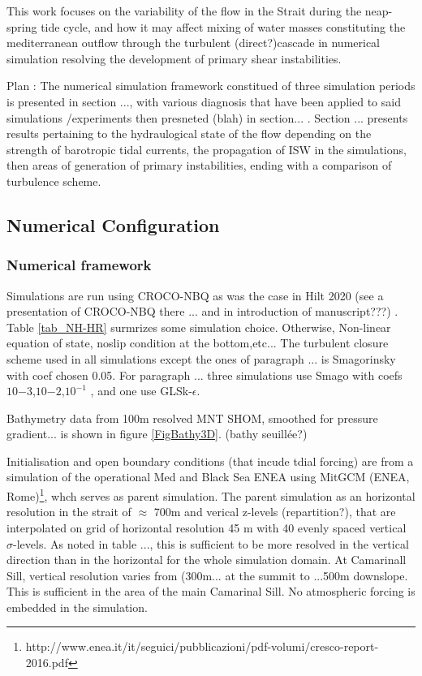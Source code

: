 This work focuses on the variability of the flow in the Strait during the neap-spring tide cycle, and how it may affect mixing of water masses constituting the mediterranean outflow through the turbulent (direct?)cascade in numerical simulation resolving the development of primary shear instabilities.

Plan :
The numerical simulation framework constitued of three simulation periods is presented in section ..., with various diagnosis that have been applied to said simulations /experiments then presneted (blah) in section... . Section ... presents results pertaining to the hydraulogical state of the flow depending on the strength of barotropic tidal currents, the propagation of ISW in the simulations, then areas of generation of primary instabilities, ending with a comparison of turbulence scheme.






\subsection{Numerical Configuration}
\subsubsection{Numerical framework}

Simulations are run using CROCO-NBQ as was the case in Hilt 2020 (see a presentation of CROCO-NBQ there ... and in introduction of manuscript???) . Table \ref{tab_NH-HR} surmrizes some simulation choice. Otherwise, Non-linear equation of state, noslip condition at the bottom,etc...  The turbulent closure scheme used in all simulations except the ones of paragraph ... is Smagorinsky with coef chosen 0.05. For paragraph ... three simulations use Smago with coefs $10{-3}$,$10{-2}$,$10^{-1}$ , and one use GLSk-$\epsilon$.

Bathymetry data from 100m resolved MNT SHOM, smoothed for pressure gradient... is shown in figure \ref{FigBathy3D}. (bathy seuillée?)


Initialisation and open boundary conditions (that incude tdial forcing) are from a simulation of the operational Med and Black Sea ENEA using MitGCM (ENEA, Rome)\footnote{http://www.enea.it/it/seguici/pubblicazioni/pdf-volumi/cresco-report-2016.pdf}, whch serves as parent simulation. The parent simulation as an horizontal resolution in the strait of $\approx$ 700m and verical z-levels (repartition?), that are interpolated on grid of horizontal resolution 45 m with 40 evenly spaced vertical $\sigma$-levels. As noted in table ..., this is sufficient to be more resolved in the vertical direction than in the horizontal for the whole simulation domain. At Camarinall Sill, vertical resolution varies from (300m... at the summit to ...500m  downslope. This is sufficient in the area of the main Camarinal Sill. No atmospheric forcing is embedded in the simulation.

